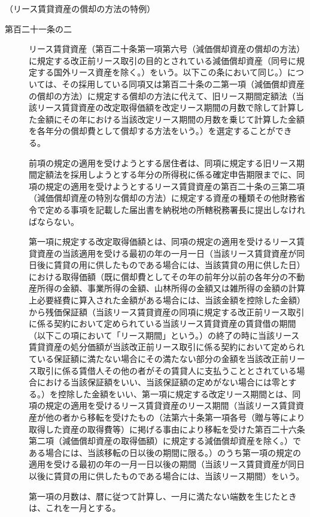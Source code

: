 \documentclass[twocolumn,a4j,10pt]{ltjtarticle}
\begin{document}
\noindent\hspace{10pt}（リース賃貸資産の償却の方法の特例）
\begin{description}
\item[第百二十一条の二]リース賃貸資産（第百二十条第一項第六号（減価償却資産の償却の方法）に規定する改正前リース取引の目的とされている減価償却資産（同号に規定する国外リース資産を除く。）をいう。以下この条において同じ。）については、その採用している同項又は第百二十条の二第一項（減価償却資産の償却の方法）に規定する償却の方法に代えて、旧リース期間定額法（当該リース賃貸資産の改定取得価額を改定リース期間の月数で除して計算した金額にその年における当該改定リース期間の月数を乗じて計算した金額を各年分の償却費として償却する方法をいう。）を選定することができる。
\item[]前項の規定の適用を受けようとする居住者は、同項に規定する旧リース期間定額法を採用しようとする年分の所得税に係る確定申告期限までに、同項の規定の適用を受けようとするリース賃貸資産の第百二十条の三第二項（減価償却資産の特別な償却の方法）に規定する資産の種類その他財務省令で定める事項を記載した届出書を納税地の所轄税務署長に提出しなければならない。
\item[]第一項に規定する改定取得価額とは、同項の規定の適用を受けるリース賃貸資産の当該適用を受ける最初の年の一月一日（当該リース賃貸資産が同日後に賃貸の用に供したものである場合には、当該賃貸の用に供した日）における取得価額（既に償却費としてその年の前年分以前の各年分の不動産所得の金額、事業所得の金額、山林所得の金額又は雑所得の金額の計算上必要経費に算入された金額がある場合には、当該金額を控除した金額）から残価保証額（当該リース賃貸資産の同項に規定する改正前リース取引に係る契約において定められている当該リース賃貸資産の賃貸借の期間（以下この項において「リース期間」という。）の終了の時に当該リース賃貸資産の処分価額が当該改正前リース取引に係る契約において定められている保証額に満たない場合にその満たない部分の金額を当該改正前リース取引に係る賃借人その他の者がその賃貸人に支払うこととされている場合における当該保証額をいい、当該保証額の定めがない場合には零とする。）を控除した金額をいい、第一項に規定する改定リース期間とは、同項の規定の適用を受けるリース賃貸資産のリース期間（当該リース賃貸資産が他の者から移転を受けたもの（法第六十条第一項各号（贈与等により取得した資産の取得費等）に掲げる事由により移転を受けた第百二十六条第二項（減価償却資産の取得価額）に規定する減価償却資産を除く。）である場合には、当該移転の日以後の期間に限る。）のうち第一項の規定の適用を受ける最初の年の一月一日以後の期間（当該リース賃貸資産が同日以後に賃貸の用に供したものである場合には、当該リース期間）をいう。
\item[]第一項の月数は、暦に従つて計算し、一月に満たない端数を生じたときは、これを一月とする。
\end{description}
\end{document}
